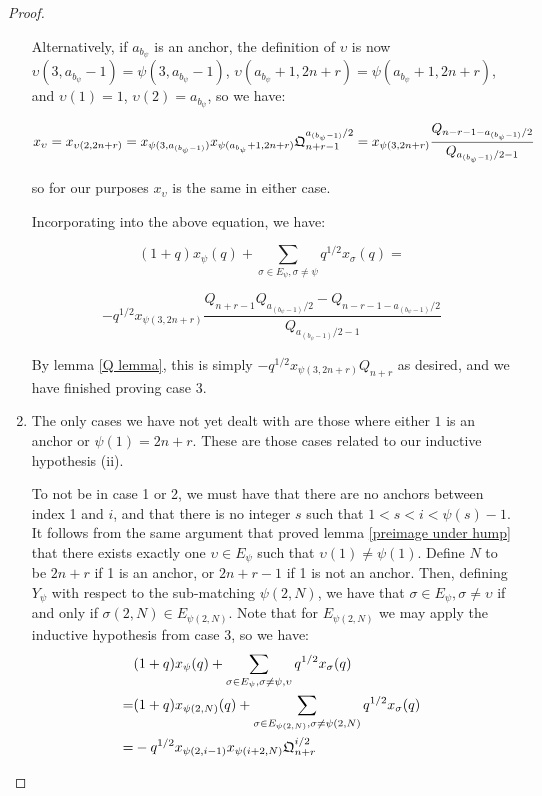 \documentclass{amsart}
\begin{document}
\begin{proof}
\begin{enumerate}[label={case \arabic*:}]
 		Alternatively, if $a_{b_\psi}$ is an anchor, the definition of $\upsilon$ is now $\upsilon(3,a_{b_\psi}-1)=\psi(3,a_{b_\psi}-1)$, $\upsilon(a_{b_\psi}+1,2n+r)=\psi(a_{b_\psi}+1,2n+r)$, and $\upsilon(1)=1$, $\upsilon(2)=a_{b_\psi}$, so we have:
 		
 		$$x_\upsilon=x_{\upsilon(2,2n+r)}=x_{\psi(3,a_{(b_\psi-1)})}x_{\psi(a_{b_\psi}+1,2n+r)}\mathfrak{Q}_{n+r-1}^{a_{(b_\psi-1)}/2}=x_{\psi(3,2n+r)}\frac{Q_{n-r-1-a_{(b_\psi-1)}/2}}{Q_{a_{(b_\psi-1)}/2-1}}$$
 		
 		so for our purposes $x_\upsilon$ is the same in either case.
 		
 		Incorporating into the above equation, we have:
 		
 		$$(1+q)x_\psi(q)+\sum_{\sigma\in E_\psi,\sigma\not=\psi}q^{1/2}x_\sigma(q)=$$
 		
 		
 		$$-q^{1/2}x_{\psi(3,2n+r)}\frac{Q_{n+r-1}Q_{a_{(b_\psi-1)}/2}-Q_{n-r-1-a_{(b_\psi-1)}/2}}{Q_{a_{(b_\psi-1)}/2-1}}$$	
 		
 		By lemma \ref{Q lemma}, this is simply $-q^{1/2}x_{\psi(3,2n+r)}Q_{n+r}$ as desired, and we have finished proving case 3.
 		\\
 		
 		\item The only cases we have not yet dealt with are those where either $1$ is an anchor or $\psi(1)=2n+r$. These are those cases related to our inductive hypothesis (ii).
 		
 		To not be in case 1 or 2, we must have that there are no anchors between index 1 and $i$, and that there is no integer $s$ such that $1<s<i<\psi(s)-1$. It follows from the same argument that proved lemma \ref{preimage under hump} that there exists exactly one $\upsilon\in E_\psi$ such that $\upsilon(1)\not=\psi(1)$. Define $N$ to be $2n+r$ if 1 is an anchor, or $2n+r-1$ if 1 is not an anchor. Then, defining $Y_\psi$ with respect to the sub-matching $\psi(2,N)$, we have that $\sigma\in E_\psi, \sigma\not=\upsilon$ if and only if $\sigma(2,N)\in E_{\psi(2,N)}$. Note that for $E_{\psi(2,N)}$ we may apply the inductive hypothesis from case 3, so we have:
 		\begin{align*}
 		&(1+q)x_\psi(q)+\sum_{\sigma\in E_\psi,\sigma\not=\psi,\upsilon}q^{1/2}x_\sigma(q)\\
 		=&(1+q)x_{\psi(2,N)}(q)+\sum_{\sigma\in E_{\psi(2,N)},\sigma\not=\psi(2,N)}q^{1/2}x_{\sigma}(q)\\
 		=&-q^{1/2}x_{\psi(2,i-1)}x_{\psi(i+2,N)}\mathfrak{Q}_{n+r}^{i/2}
 		\end{align*}
 		

\end{enumerate}
\end{proof}
\end{document}
